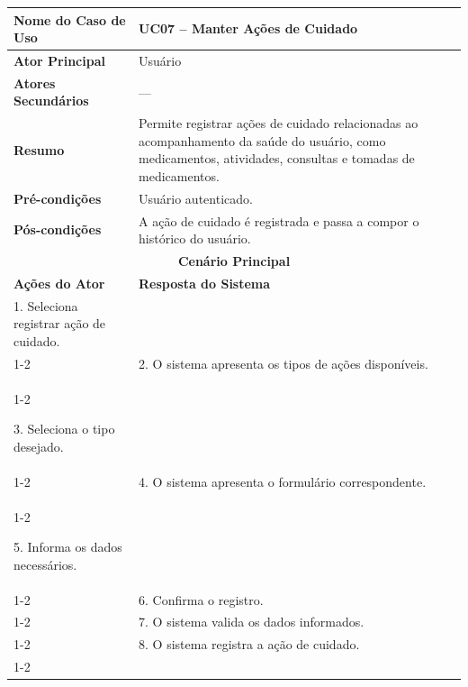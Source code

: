 
\begin{longtable}{| p{} | p{} |}
\hline

\textbf{Nome do Caso de Uso} &
UC07 -- Manter Ações de Cuidado \\
\hline

\textbf{Ator Principal} &
Usuário \\
\hline

\textbf{Atores Secundários} &
--- \\
\hline

\textbf{Resumo} &
Permite registrar ações de cuidado relacionadas ao acompanhamento da
saúde do usuário, como medicamentos, atividades, consultas e tomadas
de medicamentos. \\
\hline

\textbf{Pré-condições} &
Usuário autenticado. \\
\hline

\textbf{Pós-condições} &
A ação de cuidado é registrada e passa a compor o histórico do usuário. \\
\hline

\multicolumn{2}{|c|}{\textbf{Cenário Principal}}\\
\hline

\textbf{Ações do Ator} &
\textbf{Resposta do Sistema} \\
\hline

1. Seleciona registrar ação de cuidado. & \\
\cline{1-2}

&

2. O sistema apresenta os tipos de ações disponíveis. \\

\cline{1-2}

3. Seleciona o tipo desejado. & \\
\cline{1-2}

&
4. O sistema apresenta o formulário correspondente. \\
\cline{1-2}

5. Informa os dados necessários. & \\
\cline{1-2}

&
6. Confirma o registro. & \\
\cline{1-2}

&
7. O sistema valida os dados informados. \\
\cline{1-2}

&
8. O sistema registra a ação de cuidado. \\
\cline{1-2}


\end{longtable}
